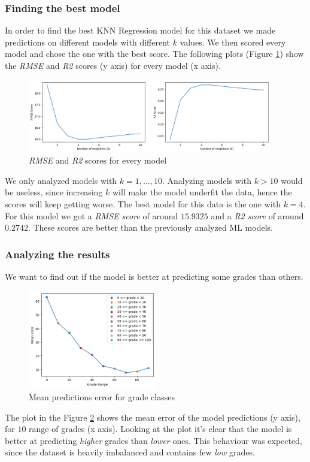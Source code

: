 \documentclass{article}
\begin{document}
\subsubsection{Finding the best model}
In order to find the best KNN Regression model for this dataset we made predictions on different models with different $k$ values. 
We then scored every model and chose the one with the best score. The following plots (Figure \ref{fig:knn-scores}) show the \textit{RMSE} and \textit{R2} scores (y axis) for every model (x axis).
\begin{figure}[ht]
\centering
\includegraphics[width=0.95\textwidth]{KNN_scores.png}
\caption{\textit{RMSE} and \textit{R2} scores for every model}
\label{fig:knn-scores}
\end{figure}
We only analyzed models with $k = 1, \ldots, 10$.
Analyzing models with $k > 10$ would be useless, since increasing $k$ will make the model underfit the data, hence the scores will keep getting worse.
The best model for this data is the one with $k = 4$.
For this model we got a \textit{RMSE score} of around $15.9325$ and a \textit{R2 score} of around $0.2742$.
These scores are better than the previously analyzed ML models.

\subsubsection{Analyzing the results}
We want to find out if the model is better at predicting some grades than others.
\begin{figure}[ht]
\centering
\includegraphics[width=0.5\textwidth]{KNN_errs_class.png}
\caption{Mean predictions error for grade classes}
\label{fig:knn-err}
\end{figure}
The plot in the Figure \ref{fig:knn-err} shows the mean error of the model predictions (y axis), for $10$ range of grades (x axis).
Looking at the plot it's clear that the model is better at predicting \textit{higher} grades than \textit{lower} ones.
This behaviour was expected, since the dataset is heavily imbalanced and contains few \textit{low} grades.
\end{document}
